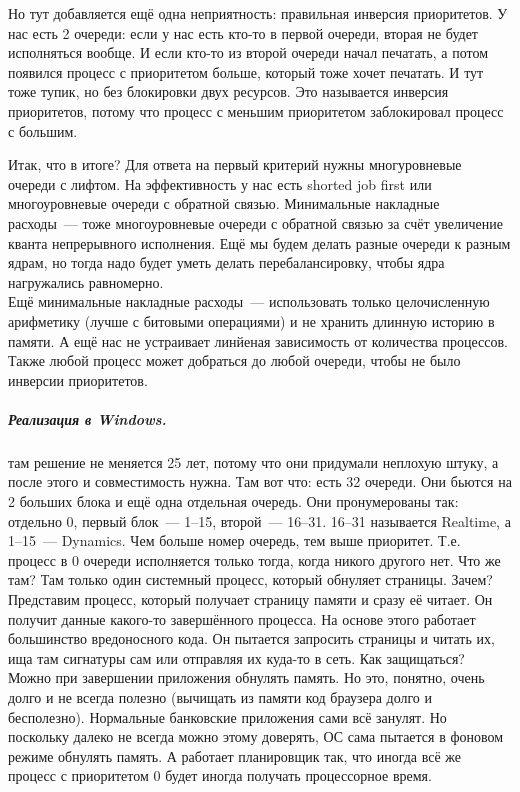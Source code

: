 \documentclass{article}
\begin{document}
\begin{enumerate}
        Но тут добавляется ещё одна неприятность: правильная инверсия приоритетов. У нас есть 2 очереди: если у нас есть кто-то в первой очереди, вторая не будет исполняться вообще. И если кто-то из второй очереди начал печатать, а потом появился процесс с приоритетом больше, который тоже хочет печатать. И тут тоже тупик, но без блокировки двух ресурсов. Это называется инверсия приоритетов, потому что процесс с меньшим приоритетом заблокировал процесс с большим.
    \end{enumerate}
    Итак, что в итоге? Для ответа на первый критерий нужны многуровневые очереди с лифтом. На эффективность у нас есть shorted job first или многоуровневые очереди с обратной связью. Минимальные накладные расходы~--- тоже многоуровневые очереди с обратной связью за счёт увеличение кванта непрерывного исполнения. Ещё мы будем делать разные очереди к разным ядрам, но тогда надо будет уметь делать перебалансировку, чтобы ядра нагружались равномерно.\\
    Ещё минимальные накладные расходы~--- использовать только целочисленную арифметику (лучше с битовыми операциями) и не хранить длинную историю в памяти. А ещё нас не устраивает линйеная зависимость от количества процессов.\\
    Также любой процесс может добраться до любой очереди, чтобы не было инверсии приоритетов.
    \subparagraph{Реализация в Windows.}
    там решение не меняется 25 лет, потому что они придумали неплохую штуку, а после этого и совместимость нужна. Там вот что: есть 32 очереди. Они бьются на 2 больших блока и ещё одна отдельная очередь. Они пронумерованы так: отдельно 0, первый блок~--- 1--15, второй~--- 16--31. 16--31 называется Realtime, а 1--15~--- Dynamics. Чем больше номер очередь, тем выше приоритет. Т.е. процесс в 0 очереди исполняется только тогда, когда никого другого нет. Что же там? Там только один системный процесс, который обнуляет страницы. Зачем? Представим процесс, который получает страницу памяти и сразу её читает. Он получит данные какого-то завершённого процесса. На основе этого работает большинство вредоносного кода. Он пытается запросить страницы и читать их, ища там сигнатуры сам или отправляя их куда-то в сеть. Как защищаться? Можно при завершении приложения обнулять память. Но это, понятно, очень долго и не всегда полезно (вычищать из памяти код браузера долго и бесполезно). Нормальные банковские приложения сами всё занулят. Но поскольку далеко не всегда можно этому доверять, ОС сама пытается в фоновом режиме обнулять память. А работает планировщик так, что иногда всё же процесс с приоритетом 0 будет иногда получать процессорное время.\\
\end{document}
